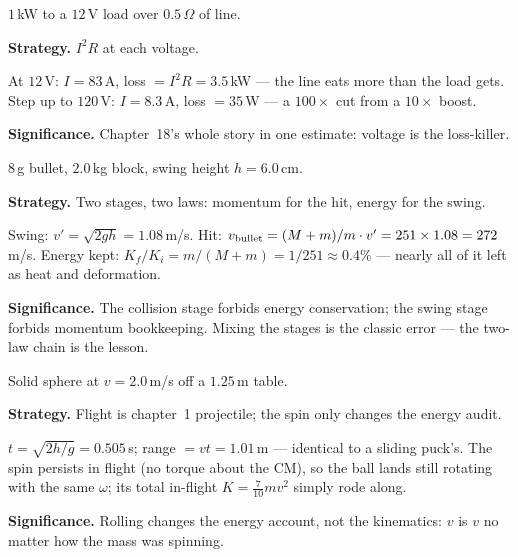 \begin{example}\label{ex:w20}
$1$\,kW to a $12$\,V load over $0.5\,\Omega$ of line.
\par\smallskip
\textbf{Strategy.} $I^{2}R$ at each voltage.
\begin{solution}
At $12$\,V: $I=83$\,A, loss $=I^{2}R=3.5$\,kW --- the line eats more
than the load gets. Step up to $120$\,V: $I=8.3$\,A, loss
$=35$\,W --- a $100\times$ cut from a $10\times$ boost.
\checkmark
\end{solution}
\textbf{Significance.} Chapter~18's whole story in one estimate:
voltage is the loss-killer.
\end{example}

\begin{example}\label{ex:w21}
$8$\,g bullet, $2.0$\,kg block, swing height $h=6.0$\,cm.
\par\smallskip
\textbf{Strategy.} Two stages, two laws: momentum for the hit, energy
for the swing.
\begin{solution}
Swing: $v'=\sqrt{2gh}=1.08$\,m/s. Hit:
$v_{\rm bullet}=(M+m)/m\cdot v'=251\times1.08=272$\,m/s.
Energy kept: $K_f/K_i=m/(M+m)=1/251\approx0.4\%$ --- nearly all of
it left as heat and deformation. \checkmark
\end{solution}
\textbf{Significance.} The collision stage forbids energy conservation;
the swing stage forbids momentum bookkeeping. Mixing the stages is
the classic error --- the two-law chain is the lesson.
\end{example}

\begin{example}\label{ex:w22}
Solid sphere at $v=2.0$\,m/s off a $1.25$\,m table.
\par\smallskip
\textbf{Strategy.} Flight is chapter~1 projectile; the spin only
changes the energy audit.
\begin{solution}
$t=\sqrt{2h/g}=0.505$\,s; range $=vt=1.01$\,m --- identical to a
sliding puck's. The spin persists in flight (no torque about the
CM), so the ball lands still rotating with the same $\omega$; its
total in-flight $K=\tfrac{7}{10}mv^{2}$ simply rode along.
\checkmark
\end{solution}
\textbf{Significance.} Rolling changes the energy account, not the
kinematics: $v$ is $v$ no matter how the mass was spinning.
\end{example}

